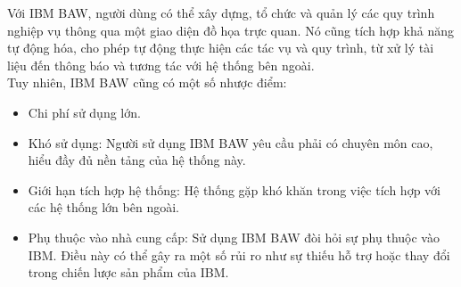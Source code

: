 Với IBM BAW, người dùng có thể xây dựng, tổ chức và quản lý các quy trình nghiệp vụ thông qua một giao diện đồ họa trực quan. Nó cũng tích hợp khả năng tự động hóa, cho phép tự động thực hiện các tác vụ và quy trình, từ xử lý tài liệu đến thông báo và tương tác với hệ thống bên ngoài.\\

Tuy nhiên, IBM BAW cũng có một số nhược điểm:
\begin{itemize}
    \item Chi phí sử dụng lớn.
    \item Khó sử dụng: Người sử dụng IBM BAW yêu cầu phải có chuyên môn cao, hiểu đầy đủ nền tảng của hệ thống này.
    \item Giới hạn tích hợp hệ thống: Hệ thống gặp khó khăn trong việc tích hợp với các hệ thống lớn bên ngoài.
    \item Phụ thuộc vào nhà cung cấp: Sử dụng IBM BAW đòi hỏi sự phụ thuộc vào IBM. Điều này có thể gây ra một số rủi ro như sự thiếu hỗ trợ hoặc thay đổi trong chiến lược sản phẩm của IBM.
\end{itemize}

